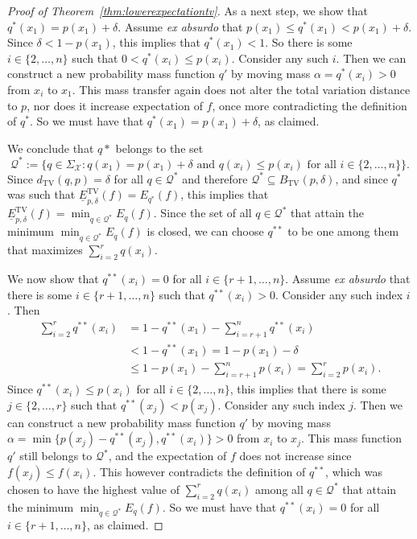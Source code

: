\documentclass[10pt,a4paper]{amsart}
\begin{document}
\begin{proof}[Proof of Theorem~\ref{thm:lowerexpectationtv}]
As a next step, we show that $q^*(x_1)=p(x_1)+\delta$. Assume \emph{ex absurdo} that $p(x_1)\leq q^*(x_1)<p(x_1)+\delta$. Since $\delta<1-p(x_1)$, this implies that $q^*(x_1)<1$. So there is some $i\in\{2,\ldots,n\}$ such that $0<q^*(x_i)\leq p(x_i)$. Consider any such $i$. Then we can construct a new probability mass function $q'$ by moving mass $\alpha=q^*(x_i)>0$ from $x_i$ to $x_1$. This mass transfer again does not alter the total variation distance to $p$, nor does it increase expectation of $f$, once more contradicting the definition of $q^*$. So we must have that $q^*(x_1)=p(x_1)+\delta$, as claimed.

We conclude that $q*$ belongs to the set
\begin{equation*}
\mathcal{Q}^*:=\{q\in\Sigma_\mathcal{X}: q(x_1)=p(x_1)+\delta\text{ and }q(x_i)\leq p(x_i)\text{ for all }i\in\{2,\ldots,n\}\}.
\end{equation*}
Since $d_\mathrm{TV}(q,p)=\delta$ for all $q\in\mathcal{Q}^*$ and therefore $\mathcal{Q}^*\subseteq B_\mathrm{TV}(p,\delta)$, and since $q^*$ was such that $\underline{E}^\mathrm{TV}_{p,\delta}(f)=E_{q^*}(f)$, this implies that $\underline{E}^\mathrm{TV}_{p,\delta}(f)=\min_{q\in\mathcal{Q}^*} E_q(f)$. Since the set of all $q\in\mathcal{Q}^*$ that attain the minimum $\min_{q\in\mathcal{Q}^*} E_q(f)$ is closed, we can choose $q^{**}$ to be one among them that maximizes $\sum_{i=2}^r q(x_i)$.

We now show that $q^{**}(x_i)=0$ for all $i\in\{r+1,\ldots,n\}$. Assume \emph{ex absurdo} that there is some $i\in\{r+1,\ldots,n\}$ such that $q^{**}(x_i)>0$. Consider any such index $i$. Then
\begin{align*}
\sum_{i=2}^r q^{**}(x_i)
&=1-q^{**}(x_1)-\sum_{i=r+1}^n q^{**}(x_i)\\
&<1-q^{**}(x_1)=1-p(x_1)-\delta\\
&\leq1-p(x_1)-\sum_{i=r+1}^n p(x_i)=\sum_{i=2}^r p(x_i).
\end{align*}
Since $q^{**}(x_i)\leq p(x_i)$ for all $i\in\{2,\ldots,n\}$, this implies that there is some $j\in\{2,\ldots,r\}$ such that $q^{**}(x_j)<p(x_j)$. Consider any such index $j$. Then we can construct a new probability mass function $q'$ by moving mass $\alpha=\min\{p(x_j)-q^{**}(x_j),q^{**}(x_i)\}>0$ from $x_i$ to $x_j$. This mass function $q'$ still belongs to $\mathcal{Q}^*$, and the expectation of $f$ does not increase since $f(x_j)\leq f(x_i)$. This however contradicts the definition of $q^{**}$, which was chosen to have the highest value of $\sum_{i=2}^r q(x_i)$ among all $q\in\mathcal{Q}^*$ that attain the minimum $\min_{q\in\mathcal{Q}^*} E_q(f)$. So we must have that $q^{**}(x_i)=0$ for all $i\in\{r+1,\ldots,n\}$, as claimed.


\end{proof}
\end{document}
